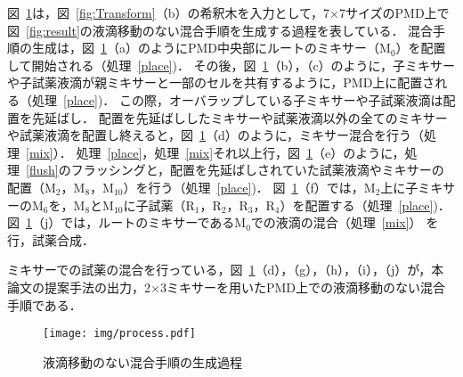 図~\ref{fig:process}は，図~\ref{fig:Transform}（b）の希釈木を入力として，7$\times$7サイズのPMD上で図~\ref{fig:result}の液滴移動のない混合手順を生成する過程を表している．
混合手順の生成は，図~\ref{fig:process}（a）のようにPMD中央部にルートのミキサー（M$_0$）を配置して開始される（処理~\ref{place})．
その後，図~\ref{fig:process}（b），（c）のように，子ミキサーや子試薬液滴が親ミキサーと一部のセルを共有するように，PMD上に配置される（処理~\ref{place})．
この際，オーバラップしている子ミキサーや子試薬液滴は配置を先延ばし． 配置を先延ばししたミキサーや試薬液滴以外の全てのミキサーや試薬液滴を配置し終えると，図~\ref{fig:process}（d）のように，ミキサー混合を行う（処理~\ref{mix}）．
処理~\ref{place}，処理~\ref{mix}それ以上行，図~\ref{fig:process}（e）のように，処理~\ref{flush}のフラッシングと，配置を先延ばしされていた試薬液滴やミキサーの配置（M$_2$，M$_8$，M$_{10}$）を行う（処理~\ref{place})．
図~\ref{fig:process}（f）では，M$_2$上に子ミキサーのM$_6$を，M$_8$とM$_{10}$に子試薬（R$_1$，R$_2$，R$_3$，R$_4$）を配置する（処理~\ref{place})．
図~\ref{fig:process}（j）では，ルートのミキサーであるM$_0$での液滴の混合（処理~\ref{mix}） を行，試薬合成．

ミキサーでの試薬の混合を行っている，図~\ref{fig:process}（d），（g），（h），（i），（j）が，本論文の提案手法の出力，2$\times$3ミキサーを用いたPMD上での液滴移動のない混合手順である． \begin{figure}[tbp]
 \centering\texttt{[image: img/process.pdf]}
 \caption{液滴移動のない混合手順の生成過程}\label{fig:process}
\end{figure}






